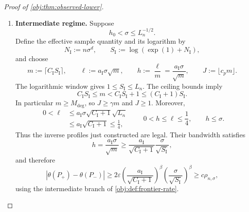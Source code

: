 \documentclass[11pt]{article}
\begin{document}
\begin{proof}[Proof of \cref{obj:thm:observed-lower}]
\begin{enumerate}
To control the sample budget, define
\[
\lambda:=\frac{\ell^2}{\sigma^2}>0.
\]
Whenever \(J\ge1\) and \(J\ge2\lambda\), consecutive factorial-series terms have ratio at most \(1/2\). Induction therefore gives
\[
\frac{\lambda^{J+k}}{(J+k)!}
\le\frac{\lambda^J}{J!}\,2^{-k}
\quad(k\in\mathbb N_0),
\qquad
\mathcal T_{\sigma,\ell,J}
\le2\frac{\lambda^J}{J!}.
\]
The nonnegative exponential series gives
\[
\frac{J^J}{J!}
\le\sum_{k=0}^\infty\frac{J^k}{k!}
=\exp(J).
\]
Multiplication by \((\lambda/J)^J\) yields
\[
\frac{\lambda^J}{J!}
\le\left(\frac{\exp(1)\lambda}{J}\right)^J,
\qquad
\mathcal T_{\sigma,\ell,J}
\le2\left(\frac{\exp(1)\lambda}{J}\right)^J.
\]
Finally, whenever \(h\le\sigma\),
\[
\sigma^{-\kappa-1}h^{2\beta+2\kappa+2}
=
h^d(h/\sigma)^{\kappa+1}
\le h^d.
\]

\item \textbf{Intermediate regime.}
Suppose
\[
h_0<\sigma\le L_n^{-1/2}.
\]
Define the effective sample quantity and its logarithm by
\[
N_{\mathrm I}:=n\sigma^d,\qquad
S_{\mathrm I}:=\log(\exp(1)+N_{\mathrm I}),
\]
and choose
\[
m:=\lceil C_{\mathrm I}S_{\mathrm I}\rceil,\qquad
\ell:=a_{\mathrm I}\sigma\sqrt m,\qquad
h:=\frac{\ell}{m}=\frac{a_{\mathrm I}\sigma}{\sqrt m},
\qquad
J:=\lfloor c_pm\rfloor.
\]
The logarithmic window gives \(1\le S_{\mathrm I}\le L_n\). The ceiling bounds imply
\[
C_{\mathrm I}S_{\mathrm I}\le m
<C_{\mathrm I}S_{\mathrm I}+1
\le(C_{\mathrm I}+1)S_{\mathrm I}.
\]
In particular \(m\ge M_{\mathrm{deg}}\), so \(J\ge\gamma m\) and \(J\ge1\). Moreover,
\[
\begin{aligned}
0<\ell
&\le a_{\mathrm I}\sigma
\sqrt{C_{\mathrm I}+1}\sqrt{L_n}\\
&\le a_{\mathrm I}\sqrt{C_{\mathrm I}+1}
\le\frac14,
\end{aligned}
\qquad
0<h\le\ell\le\frac14,\qquad h\le\sigma.
\]
Thus the inverse profiles just constructed are legal. Their bandwidth satisfies
\[
h=\frac{a_{\mathrm I}\sigma}{\sqrt m}
\ge
\frac{a_{\mathrm I}}{\sqrt{C_{\mathrm I}+1}}
\frac{\sigma}{\sqrt{S_{\mathrm I}}},
\]
and therefore
\[
|\theta(P_+)-\theta(P_-)|
\ge
2\varepsilon
\left(\frac{a_{\mathrm I}}{\sqrt{C_{\mathrm I}+1}}\right)^\beta
\left(\frac{\sigma}{\sqrt{S_{\mathrm I}}}\right)^\beta
\ge c\rho_{n,\sigma},
\]
using the intermediate branch of \cref{obj:def:frontier-rate}.


\end{enumerate}
\end{proof}
\end{document}
